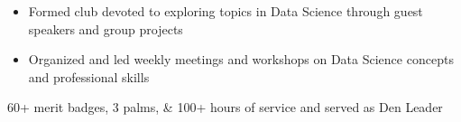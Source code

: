 \documentclass[10pt, letterpaper]{awesome-cv}
\begin{document}
\vspace*{-1ex}    
\vspace*{-2ex}    
\begin{skills}
    {\vspace*{-2.5ex}
    \begin{itemize}[noitemsep, label=\bullet]
        \item Formed club devoted to exploring topics in Data Science through guest speakers and group projects
        \item Organized and led weekly meetings and workshops on Data Science concepts and professional skills
    \end{itemize}
    \vspace*{-3.5ex}}
    
    
    
    
    
    
    
    {60+ merit badges, 3 palms, \& 100+ hours of service and served as Den Leader}
\end{skills}
\end{document}
